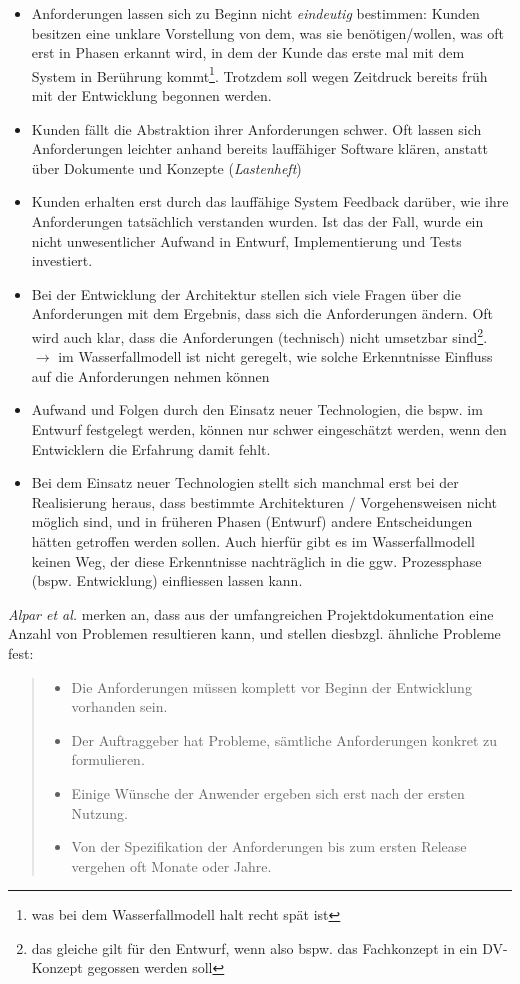 \begin{itemize}
    \item Anforderungen lassen sich zu Beginn nicht \textit{eindeutig} bestimmen: Kunden besitzen eine unklare Vorstellung von dem, was sie benötigen/wollen, was oft erst in Phasen erkannt wird, in dem der Kunde das erste mal mit dem System in Berührung kommt\footnote{
    was bei dem Wasserfallmodell halt recht spät ist
    }.
    Trotzdem soll wegen Zeitdruck bereits früh mit der Entwicklung begonnen werden.
    \item Kunden fällt die Abstraktion ihrer Anforderungen schwer.
    Oft lassen sich Anforderungen leichter anhand bereits lauffähiger Software klären, anstatt über Dokumente und Konzepte (\textit{Lastenheft})
    \item Kunden erhalten erst durch das lauffähige System Feedback darüber, wie ihre Anforderungen tatsächlich verstanden wurden.
    Ist das der Fall, wurde ein nicht unwesentlicher Aufwand in Entwurf, Implementierung und Tests investiert.
    \item Bei der Entwicklung der Architektur stellen sich viele Fragen über die Anforderungen mit dem Ergebnis, dass sich die Anforderungen ändern.
    Oft wird auch klar, dass die Anforderungen (technisch) nicht umsetzbar sind\footnote{
     das gleiche gilt für den Entwurf, wenn also bspw. das Fachkonzept in ein DV-Konzept gegossen werden soll
    }.
    $\rightarrow$ im Wasserfallmodell ist nicht geregelt, wie solche Erkenntnisse Einfluss auf die Anforderungen nehmen können
    \item Aufwand und Folgen durch den Einsatz neuer Technologien, die bspw. im Entwurf festgelegt werden, können nur schwer eingeschätzt werden, wenn den Entwicklern die Erfahrung damit fehlt.
    \item Bei dem Einsatz neuer Technologien stellt sich manchmal erst bei der Realisierung heraus, dass bestimmte Architekturen / Vorgehensweisen nicht möglich sind, und in früheren Phasen (Entwurf) andere Entscheidungen hätten getroffen werden sollen.
    Auch hierfür gibt es im Wasserfallmodell keinen Weg, der diese Erkenntnisse nachträglich in die ggw. Prozessphase (bspw. Entwicklung) einfliessen lassen kann.
\end{itemize}

\textit{Alpar et al.} merken an, dass aus der umfangreichen Projektdokumentation eine Anzahl von Problemen resultieren kann, und stellen diesbzgl. ähnliche Probleme fest:

\blockquote[{\cite[323]{AABG14n}}]{
    \begin{itemize}
        \item Die Anforderungen müssen komplett vor Beginn der Entwicklung vorhanden
        sein.
        \item Der Auftraggeber hat Probleme, sämtliche Anforderungen konkret zu formulieren.
        \item Einige Wünsche der Anwender ergeben sich erst nach der ersten Nutzung.
        \item Von der Spezifikation der Anforderungen bis zum ersten Release vergehen oft
        Monate oder Jahre.
    \end{itemize}
}

